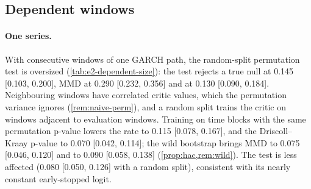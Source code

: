 \subsection{Dependent windows}\label{sec:sim-dependent}

\begin{table}[tbp]
  \centering
  \caption{Size with dependent windows of one series (E2 part g): each sample is $n=500$
    consecutive windows of $L=20$ days of one long \GARCHt{} path (persistence 0.98; independent
    paths, so $H_0$ holds). Rejection rates with Wilson 95\% intervals over $N=200$ replications.}
  \label{tab:e2-dependent-size}
  \small
\end{table}

\paragraph{One series.}
With consecutive windows of one GARCH path, the random-split permutation test is oversized
(\cref{tab:e2-dependent-size}): the \WC{} test rejects a true null at 0.145 [0.103, 0.200], MMD at
0.290 [0.232, 0.356] and \SigMMD{} at 0.130 [0.090, 0.184]. Neighbouring windows have correlated
critic values, which the permutation variance ignores (\cref{rem:naive-perm}), and a random split
trains the critic on windows adjacent to evaluation windows. Training on time blocks with the same
permutation p-value lowers the \WC{} rate to 0.115 [0.078, 0.167], and the Driscoll--Kraay p-value to
0.070 [0.042, 0.114]; the wild bootstrap brings MMD to 0.075 [0.046, 0.120] and \SigMMD{} to 0.090
[0.058, 0.138] (\cref{prop:hac,rem:wild}). The \LRC{} test is less affected (0.080 [0.050, 0.126]
with a random split), consistent with its nearly constant early-stopped logit.

